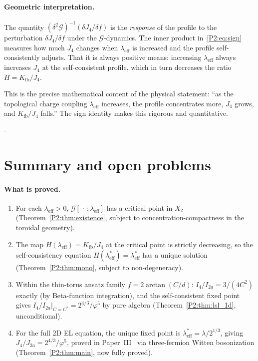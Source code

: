 \documentclass[11pt,a4paper]{article}
\newcommand{\vp}{\varphi}
\newcommand{\lam}{\lambda}
\newcommand{\leff}{\lambda_{\mathrm{eff}}}
\newcommand{\Kfb}{K_{\mathrm{fb}}}
\newcommand{\Ja}{J_{2a}}
\newcommand{\Jfour}{J_{4}}
\newcommand{\G}{\mathcal{G}}
\newcommand{\Ia}{I_{2a}}
\newcommand{\Ib}{I_{4}}
\theoremstyle{remark}
\begin{document}
\paragraph{Geometric interpretation.}
The quantity $(\delta^2\G)^{-1}(\delta\Jfour/\delta f)$ is the
\emph{response} of the profile to the perturbation $\delta\Jfour/\delta f$
under the $\G$-dynamics.  The inner product in~\eqref{P2:eq:sign} measures
how much $\Jfour$ changes when $\leff$ is increased and the profile
self-consistently adjusts.  That it is always positive means: increasing
$\leff$ always increases $\Jfour$ at the self-consistent profile, which
in turn decreases the ratio $H = \Kfb/\Jfour$.

This is the precise mathematical content of the physical statement:
``as the topological charge coupling $\leff$ increases, the profile
concentrates more, $J_4$ grows, and $K_\mathrm{fb}/J_4$ falls.''  The sign identity
makes this rigorous and quantitative.

-%
\section{Summary and open problems}
\label{P2:sec:summary}

\paragraph{What is proved.}
\begin{enumerate}[noitemsep]
  \item For each $\leff>0$, $\G[\,\cdot\,;\leff]$ has a critical point
    in $X_2$ (Theorem~\ref{P2:thm:existence}, subject to
    concentration-compactness in the toroidal geometry).
  \item The map $H(\leff)=\Kfb/\Jfour$ at the critical point is
    strictly decreasing, so the self-consistency equation $H(\leff^*)=\leff^*$
    has a unique solution (Theorem~\ref{P2:thm:mono}, subject to non-degeneracy).
  \item Within the thin-torus ansatz family $f=2\arctan(C/d)$:
    $\Ib/\Ia = 3/(4C^2)$ exactly (by Beta-function integration), and
    the self-consistent fixed point gives
    $\Ib/\Ia\big|_{C=C^*} = 2^{4/3}/\vp^5$ by pure algebra
    (Theorem~\ref{P2:thm:lsl_1d}, unconditional).
  \item For the full 2D EL equation, the unique fixed point is
    $\leff^*=\lam/2^{1/3}$, giving $\Jfour/\Ja = 2^{4/3}/\vp^5$,
    proved in Paper~III~\cite{Paper3} via three-fermion Witten bosonization
    (Theorem~\ref{P2:thm:main}, now fully proved).
\end{enumerate}
\end{document}
